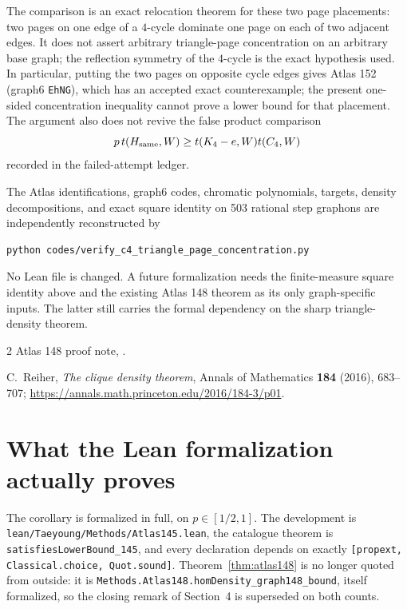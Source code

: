 \documentclass[11pt]{article}
\begin{document}
The comparison is an exact relocation theorem for these two page placements:
two pages on one edge of a $4$-cycle dominate one page on each of two adjacent
edges.  It does not assert arbitrary triangle-page concentration on an
arbitrary base graph; the reflection symmetry of the $4$-cycle is the exact
hypothesis used.  In particular, putting the two pages on opposite cycle
edges gives Atlas 152 (graph6 \texttt{EhNG}), which has an accepted exact
counterexample; the present one-sided concentration inequality cannot prove
a lower bound for that placement.  The argument also does not revive the
false product comparison
\[
 p\,t(H_{\rm same},W)\geq t(K_4-e,W)t(C_4,W)
\]
recorded in the failed-attempt ledger.

The Atlas identifications, graph6 codes, chromatic polynomials, targets,
density decompositions, and exact square identity on 503 rational step
graphons are independently reconstructed by
\begin{verbatim}
python codes/verify_c4_triangle_page_concentration.py
\end{verbatim}

No Lean file is changed.  A future formalization needs the finite-measure
square identity above and the existing Atlas 148 theorem as its only
graph-specific inputs.  The latter still carries the formal dependency on
the sharp triangle-density theorem.

\begin{thebibliography}{2}
Atlas 148 proof note,
.

C.~Reiher,
\emph{The clique density theorem},
Annals of Mathematics \textbf{184} (2016), 683--707;
\url{https://annals.math.princeton.edu/2016/184-3/p01}.
\end{thebibliography}


\appendix
\section{What the Lean formalization actually proves}

The corollary is formalized in full, on $p\in[1/2,1]$.  The development is
\texttt{lean/Taeyoung/Methods/Atlas145.lean}, the catalogue theorem is
\texttt{satisfiesLowerBound\_145}, and every declaration depends on exactly
\texttt{[propext, Classical.choice, Quot.sound]}.  Theorem~\ref{thm:atlas148}
is no longer quoted from outside: it is
\texttt{Methods.Atlas148.homDensity\_graph148\_bound}, itself formalized, so
the closing remark of Section~4 is superseded on both counts.
\end{document}
